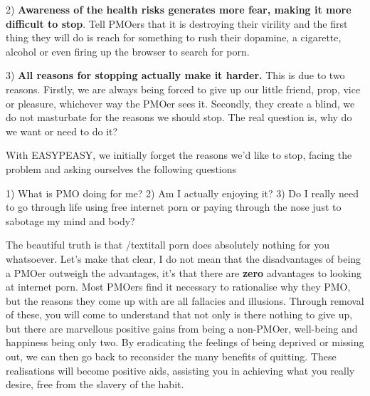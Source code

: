 2) \textbf{Awareness of the health risks generates more fear, making it more difficult to stop}. Tell PMOers that it is destroying their virility and the first thing they will do is reach for something to rush their dopamine, a cigarette, alcohol or even firing up the browser to search for porn.

3) \textbf{All reasons for stopping actually make it harder.} This is due to two reasons. Firstly, we are always being forced to give up our little friend, prop, vice or pleasure, whichever way the PMOer sees it. Secondly, they create a blind, we do not masturbate for the reasons we should stop. The real question is, why do we want or need to do it?

With EASYPEASY, we initially forget the reasons we'd like to stop, facing the problem and asking ourselves the following questions

1) What is PMO doing for me?
2) Am I actually enjoying it?
3) Do I really need to go through life using free internet porn or paying through the nose just to sabotage my mind and body?

The beautiful truth is that /textit{all porn} does absolutely nothing for you whatsoever. Let's make that clear, I do not mean that the disadvantages of being a PMOer outweigh the advantages, it's that there are \textbf{zero} advantages to looking at internet porn. Most PMOers find it necessary to rationalise why they PMO, but the reasons they come up with are all fallacies and illusions. Through removal of these, you will come to understand that not only is there nothing to give up, but there are marvellous positive gains from being a non-PMOer, well-being and happiness being only two. By eradicating the feelings of being deprived or missing out, we can then go back to reconsider the many benefits of quitting. These realisations will become positive aids, assisting you in achieving what you really desire, free from the slavery of the habit.
